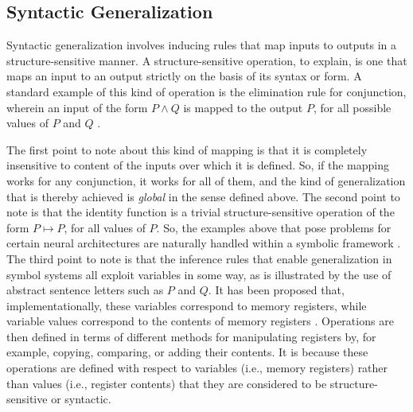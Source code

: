 \subsection{Syntactic Generalization}

Syntactic generalization involves inducing rules that map inputs to outputs in a structure-sensitive manner. A structure-sensitive operation, to explain, is one that maps an input to an output strictly on the basis of its syntax or form. A standard example of this kind of operation is the elimination rule for conjunction, wherein an input of the form $P \land Q$ is mapped to the output $P$, for all possible values of $P$ and $Q$ \citep{FodorPylyshyn:1988}. 

The first point to note about this kind of mapping is that it is completely insensitive to content of the inputs over which it is defined. So, if the mapping works for any conjunction, it works for all of them, and the kind of generalization that is thereby achieved is \textit{global} in the sense defined above. The second point to note is that the identity function is a trivial structure-sensitive operation of the form $P \mapsto P$, for all values of $P$. So, the examples above that pose problems for certain neural architectures are naturally handled within a symbolic framework \citep{Hadley:2009,Marcus:1998}. The third point to note is that the inference rules that enable generalization in symbol systems all exploit variables in some way, as is illustrated by the use of abstract sentence letters such as $P$ and $Q$. It has been proposed that, implementationally, these variables correspond to memory registers, while variable values correspond to the contents of memory registers \citep{Marcus:1998}. Operations are then defined in terms of different methods for manipulating registers by, for example, copying, comparing, or adding their contents. It is because these operations are defined with respect to variables (i.e., memory registers) rather than values (i.e., register contents) that they are considered to be structure-sensitive or syntactic.

